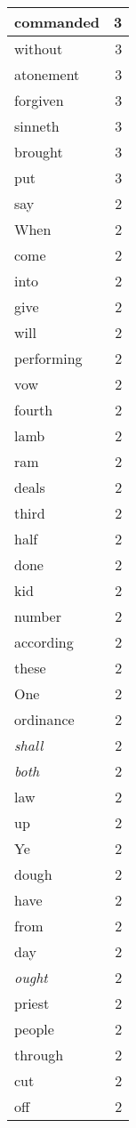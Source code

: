\begin{center}
\begin{longtable}{l|r}
commanded & 3 \\ \hline
without & 3 \\ \hline
atonement & 3 \\ \hline
forgiven & 3 \\ \hline
sinneth & 3 \\ \hline
brought & 3 \\ \hline
put & 3 \\ \hline
say & 2 \\ \hline
When & 2 \\ \hline
come & 2 \\ \hline
into & 2 \\ \hline
give & 2 \\ \hline
will & 2 \\ \hline
performing & 2 \\ \hline
vow & 2 \\ \hline
fourth & 2 \\ \hline
lamb & 2 \\ \hline
ram & 2 \\ \hline
deals & 2 \\ \hline
third & 2 \\ \hline
half & 2 \\ \hline
done & 2 \\ \hline
kid & 2 \\ \hline
number & 2 \\ \hline
according & 2 \\ \hline
these & 2 \\ \hline
One & 2 \\ \hline
ordinance & 2 \\ \hline
\emph{shall} & 2 \\ \hline
\emph{both} & 2 \\ \hline
law & 2 \\ \hline
up & 2 \\ \hline
Ye & 2 \\ \hline
dough & 2 \\ \hline
have & 2 \\ \hline
from & 2 \\ \hline
day & 2 \\ \hline
\emph{ought} & 2 \\ \hline
priest & 2 \\ \hline
people & 2 \\ \hline
through & 2 \\ \hline
cut & 2 \\ \hline
off & 2 \\ \hline

\end{longtable}
\end{center}
